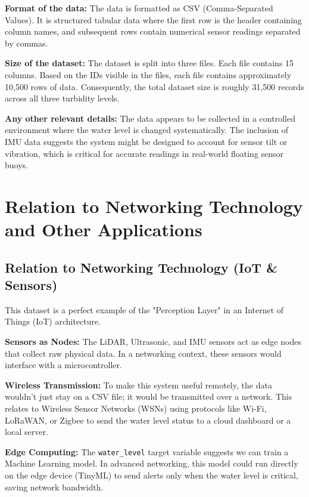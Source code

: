 \documentclass[12pt, a4paper]{article}
\begin{document}
\vspace{0.2cm} 

\textbf{Format of the data:} The data is formatted as CSV (Comma-Separated Values). It is structured tabular data where the first row is the header containing column names, and subsequent rows contain numerical sensor readings separated by commas.

\vspace{0.3cm}

\textbf{Size of the dataset:} The dataset is split into three files. Each file contains 15 columns. Based on the IDs visible in the files, each file contains approximately 10,500 rows of data. Consequently, the total dataset size is roughly 31,500 records across all three turbidity levels.

\vspace{0.3cm}

\textbf{Any other relevant details:} The data appears to be collected in a controlled environment where the water level is changed systematically. The inclusion of IMU data suggests the system might be designed to account for sensor tilt or vibration, which is critical for accurate readings in real-world floating sensor buoys.


\section{Relation to Networking Technology and Other Applications}

\subsection{Relation to Networking Technology (IoT \& Sensors)}
This dataset is a perfect example of the "Perception Layer" in an Internet of Things (IoT) architecture.

\textbf{Sensors as Nodes:} The LiDAR, Ultrasonic, and IMU sensors act as edge nodes that collect raw physical data. In a networking context, these sensors would interface with a microcontroller.
    
\textbf{Wireless Transmission:} To make this system useful remotely, the data wouldn't just stay on a CSV file; it would be transmitted over a network. This relates to Wireless Sensor Networks (WSNs) using protocols like Wi-Fi, LoRaWAN, or Zigbee to send the water level status to a cloud dashboard or a local server.
    
\textbf{Edge Computing:} The \texttt{water\_level} target variable suggests we can train a Machine Learning model. In advanced networking, this model could run directly on the edge device (TinyML) to send alerts only when the water level is critical, saving network bandwidth.
\end{document}
